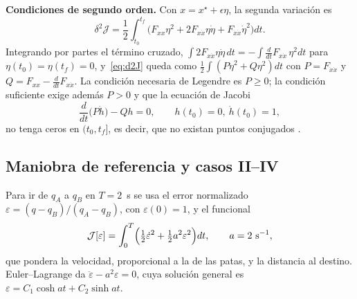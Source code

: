 \documentclass[conference]{IEEEtran}
\begin{document}
\textbf{Condiciones de segundo orden.} Con $x = x^\star + \epsilon\eta$, la segunda variación es
\begin{equation}
\delta^2\mathcal J = \frac12\int_{t_0}^{t_f}\bigl(F_{xx}\eta^2 + 2F_{x\dot x}\eta\dot\eta + F_{\dot x\dot x}\dot\eta^2\bigr)dt .
\label{eq:d2J}
\end{equation}
Integrando por partes el término cruzado, $\int2F_{x\dot x}\eta\dot\eta\,dt = -\int\frac{d}{dt}F_{x\dot x}\,\eta^2dt$ para $\eta(t_0) = \eta(t_f) = 0$, y~\eqref{eq:d2J} queda como $\frac12\int(P\dot\eta^2 + Q\eta^2)dt$ con $P = F_{\dot x\dot x}$ y $Q = F_{xx} - \frac{d}{dt}F_{x\dot x}$. La condición necesaria de Legendre es $P \ge 0$; la condición suficiente exige además $P > 0$ y que la ecuación de Jacobi
\begin{equation}
\frac{d}{dt}\bigl(P\dot h\bigr) - Qh = 0,\qquad h(t_0) = 0,\ \dot h(t_0) = 1,
\label{eq:jacobi}
\end{equation}
no tenga ceros en $(t_0, t_f]$, es decir, que no existan puntos conjugados \cite{gelfand1963}.

\subsection{Maniobra de referencia y casos II--IV}

Para ir de $q_A$ a $q_B$ en $T = 2$~s se usa el error normalizado $\varepsilon = (q - q_B)/(q_A - q_B)$, con $\varepsilon(0) = 1$, y el funcional
\begin{equation}
\mathcal J[\varepsilon] = \int_0^T\Bigl(\tfrac12\dot\varepsilon^2 + \tfrac12a^2\varepsilon^2\Bigr)dt,\qquad a = 2\ \text{s}^{-1},
\label{eq:Fvar}
\end{equation}
que pondera la velocidad, proporcional a la de las patas, y la distancia al destino. Euler--Lagrange da $\ddot\varepsilon - a^2\varepsilon = 0$, cuya solución general es $\varepsilon = C_1\cosh at + C_2\sinh at$.
\end{document}

